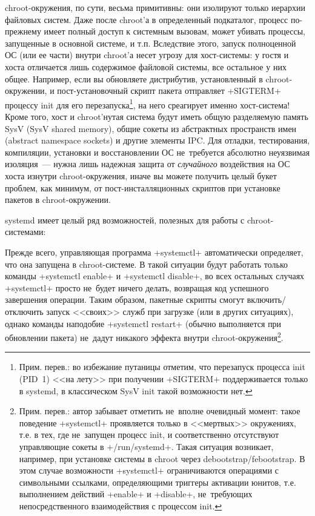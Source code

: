 \documentclass[10pt,oneside,a4paper]{article}
\begin{document}
chroot-окружения, по сути, весьма примитивны: они изолируют только иерархии
файловых систем. Даже после chroot'а в определенный подкаталог, процесс
по-прежнему имеет полный доступ к системным вызовам, может убивать процессы,
запущенные в основной системе, и т.п. Вследствие этого, запуск полноценной ОС
(или ее части) внутри chroot'а несет угрозу для хост-системы: у гостя и хоста
отличается лишь содержимое файловой системы, все остальное у них общее.
Например, если вы обновляете дистрибутив, установленный в chroot-окружении, и
пост-установочный скрипт пакета отправляет +SIGTERM+ процессу init для его
перезапуска\footnote{Прим. перев.: во избежание путаницы отметим, что перезапуск
процесса init (PID~1) <<на лету>> при получении +SIGTERM+ поддерживается только
в systemd, в классическом SysV init такой возможности нет.}, на него среагирует
именно хост-система! Кроме того, хост и chroot'нутая система будут иметь общую
разделяемую память SysV (SysV shared memory), общие сокеты из абстрактных
пространств имен (abstract namespace sockets) и другие элементы IPC. Для
отладки, тестирования, компиляции, установки и восстановлении ОС не~требуется
абсолютно неуязвимая изоляция~--- нужна лишь надежная защита от
\emph{случайного} воздействия на ОС хоста изнутри chroot-окружения, иначе вы
можете получить целый букет проблем, как минимум, от пост-инсталляционных
скриптов при установке пакетов в chroot-окружении.

systemd имеет целый ряд возможностей, полезных для работы с chroot-системами:

Прежде всего, управляющая программа +systemctl+ автоматически определяет, что
она запущена в chroot-системе. В такой ситуации будут работать только команды
+systemctl enable+ и +systemctl disable+, во всех остальных случаях +systemctl+
просто не~будет ничего делать, возвращая код успешного завершения операции.
Таким образом, пакетные скрипты смогут включить/отключить запуск <<своих>> служб
при загрузке (или в других ситуациях), однако команды наподобие
+systemctl restart+ (обычно выполняется при обновлении пакета) не~дадут никакого
эффекта внутри chroot-окружения\footnote{Прим. перев.: автор забывает отметить
не~вполне очевидный момент: такое поведение +systemctl+ проявляется только в
<<мертвых>> окружениях, т.е. в тех, где не~запущен процесс init, и
соответственно отсутствуют управляющие сокеты в +/run/systemd+. Такая ситуация
возникает, например, при установке системы в chroot через
debootstrap/febootstrap. В этом случае возможности +systemctl+ ограничиваются
операциями с символьными ссылками, определяющими триггеры активации юнитов, т.е.
выполнением действий +enable+ и +disable+, не~требующих непосредственного
взаимодействия с процессом init.}.
\end{document}
